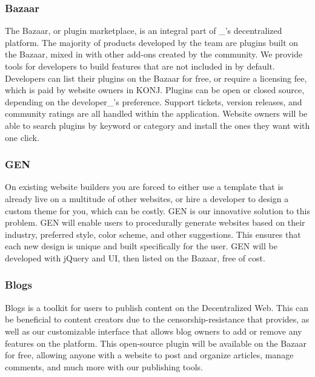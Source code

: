 \documentclass{kwp-builder}
\begin{document}
\subsubsection{Bazaar}

\tab The Bazaar, or plugin marketplace, is an integral part of \konjure\_{’}s decentralized platform. The majority of products developed by the \konjure team are plugins built on the Bazaar, mixed in with other add-ons created by the community. We provide tools for developers to build features that are not included in \konjure by default. Developers can list their plugins on the Bazaar for free, or require a licensing fee, which is paid by website owners in KONJ. Plugins can be open or closed source, depending on the developer\_{’}s preference. Support tickets, version releases, and community ratings are all handled within the application. Website owners will be able to search plugins by keyword or category and install the ones they want with one click.

\subsubsection{\konjure GEN}

\tab On existing website builders you are forced to either use a template that is already live on a multitude of other websites, or hire a developer to design a custom theme for you, which can be costly. \konjure GEN is our innovative solution to this problem. GEN will enable users to procedurally generate websites based on their industry, preferred style, color scheme, and other suggestions. This ensures that each new design is unique and built specifically for the user. GEN will be developed with jQuery and \konjure UI, then listed on the Bazaar, free of cost.

\newpage

\subsubsection{\konjure Blogs}

\tab \konjure Blogs is a toolkit for users to publish content on the Decentralized Web. This can be beneficial to content creators due to the censorship-resistance that \konjure provides, as well as our customizable interface that allows blog owners to add or remove any features on the platform. This open-source plugin will be available on the Bazaar for free, allowing anyone with a \konjure website to post and organize articles, manage comments, and much more with our publishing tools.
\end{document}
